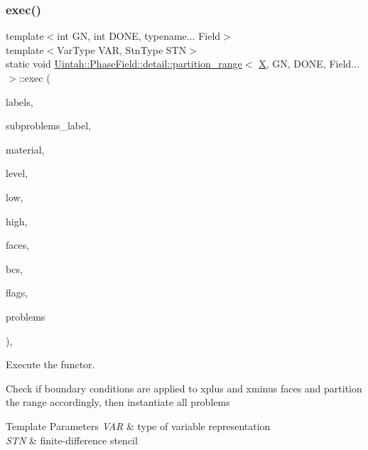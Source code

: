 \subsubsection{\texorpdfstring{exec()}{exec()}}
{\footnotesize\ttfamily template$<$int GN, int D\+O\+NE, typename... Field$>$ \\
template$<$Var\+Type V\+AR, Stn\+Type S\+TN$>$ \\
static void \hyperlink{structUintah_1_1PhaseField_1_1detail_1_1partition__range}{Uintah\+::\+Phase\+Field\+::detail\+::partition\+\_\+range}$<$ \hyperlink{namespaceUintah_1_1PhaseField_a94555da848596a419ae2c0e32649e1dcabccb3e56e2d911af492cf381d06809b6}{X}, GN, D\+O\+NE, Field... $>$\+::exec (\begin{DoxyParamCaption}\item[{const typename Field\+::label\+\_\+type \&...}]{labels,  }\item[{const Var\+Label $\ast$}]{subproblems\+\_\+label,  }\item[{int}]{material,  }\item[{const Level $\ast$}]{level,  }\item[{Int\+Vector}]{low,  }\item[{Int\+Vector}]{high,  }\item[{std\+::list$<$ Patch\+::\+Face\+Type $>$}]{faces,  }\item[{const std\+::array$<$ \hyperlink{structUintah_1_1PhaseField_1_1BCInfo}{B\+C\+Info}$<$ Field $>$, 2 $\ast$\hyperlink{structUintah_1_1PhaseField_1_1get__stn}{get\+\_\+stn}$<$ S\+TN $>$\+::dim $>$ \&...}]{bcs,  }\item[{std\+::array$<$ bool, 2 $\ast$\hyperlink{structUintah_1_1PhaseField_1_1get__stn}{get\+\_\+stn}$<$ S\+TN $>$\+::dim $>$ \&}]{flags,  }\item[{std\+::list$<$ \hyperlink{classUintah_1_1PhaseField_1_1Problem}{Problem}$<$ V\+AR, S\+TN, Field... $>$ $>$ \&}]{problems }\end{DoxyParamCaption})\hspace{0.3cm}{\ttfamily [inline]}, {\ttfamily [static]}}



Execute the functor. 

Check if boundary conditions are applied to xplus and xminus faces and partition the range accordingly, then instantiate all problems


\begin{DoxyTemplParams}{Template Parameters}
{\em V\+AR} & type of variable representation \\
\hline
{\em S\+TN} & finite-\/difference stencil \\
\hline
\end{DoxyTemplParams}

